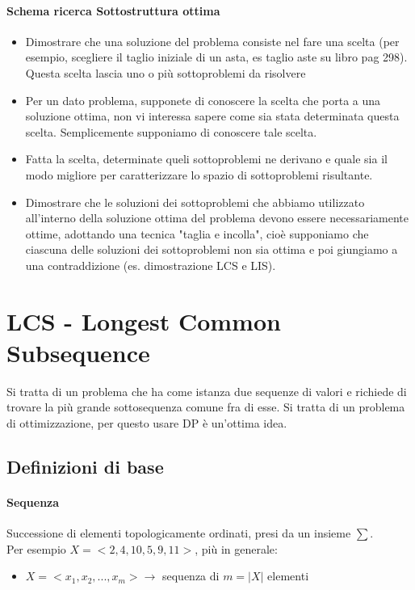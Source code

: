 \paragraph*{Schema ricerca Sottostruttura ottima}
\begin{itemize}
    \item Dimostrare che una soluzione del problema consiste nel fare una scelta (per esempio,
    scegliere il taglio iniziale di un asta, es taglio aste su libro pag 298). Questa scelta lascia uno o
    più sottoproblemi da risolvere
    \item Per un dato problema, supponete di conoscere la scelta che porta a una soluzione ottima, non vi interessa sapere
    come sia stata determinata questa scelta. Semplicemente supponiamo di conoscere tale scelta.
    \item Fatta la scelta, determinate queli sottoproblemi ne derivano e quale sia il modo migliore per
    caratterizzare lo spazio di sottoproblemi risultante.
    \item Dimostrare che le soluzioni dei sottoproblemi che abbiamo utilizzato all'interno della soluzione ottima del
    problema devono essere necessariamente ottime, adottando una tecnica "taglia e incolla", cioè supponiamo che ciascuna
    delle soluzioni dei sottoproblemi non sia ottima e poi giungiamo a una contraddizione (es. dimostrazione LCS e LIS).
\end{itemize}
\section{LCS - Longest Common Subsequence}
Si tratta di un problema che ha come istanza due sequenze di valori e richiede di trovare la 
più grande sottosequenza comune fra di esse. Si tratta di un problema di ottimizzazione, per questo
usare DP è un'ottima idea.
\subsection{Definizioni di base}
\paragraph*{Sequenza} Successione di elementi topologicamente ordinati, presi da un insieme
$\sum$.\\
Per esempio $X=<2,4,10,5,9,11>$, più in generale:
\begin{itemize}
    \item $X=<x_1, x_2, ..., x_m> \rightarrow$ sequenza di $m=|X|$ elementi
\end{itemize}
